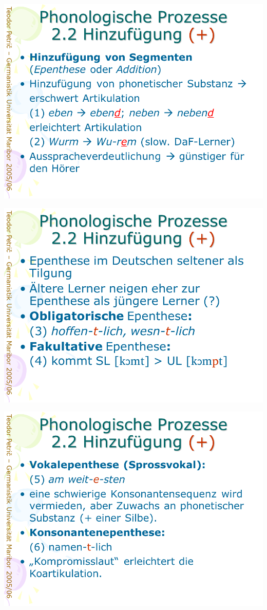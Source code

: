 \documentclass[
  letterpaper,
]{scrbook}
\begin{document}
\includegraphics[width=1\textwidth,height=\textheight]{./pictures/prozesse/prozesse_12.PNG}

\includegraphics[width=1\textwidth,height=\textheight]{./pictures/prozesse/prozesse_13.PNG}

\includegraphics[width=1\textwidth,height=\textheight]{./pictures/prozesse/prozesse_14.PNG}
\end{document}
